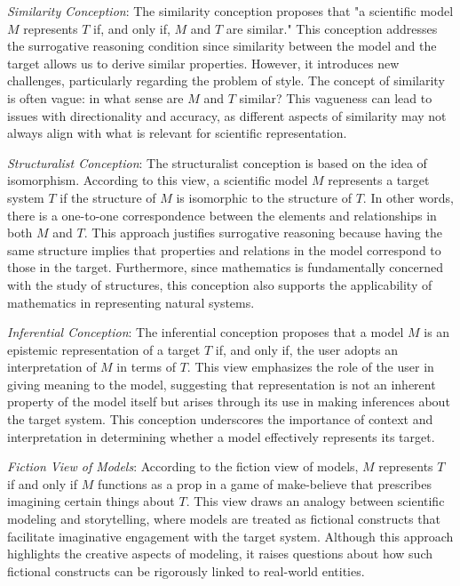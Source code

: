 \emph{Similarity Conception}: The similarity conception proposes that "a scientific model $M$ represents $T$ if, and only if, $M$ and $T$ are similar." This conception addresses the surrogative reasoning condition since similarity between the model and the target allows us to derive similar properties. However, it introduces new challenges, particularly regarding the problem of style. The concept of similarity is often vague: in what sense are $M$ and $T$ similar? This vagueness can lead to issues with directionality and accuracy, as different aspects of similarity may not always align with what is relevant for scientific representation.

\emph{Structuralist Conception}: The structuralist conception is based on the idea of isomorphism. According to this view, a scientific model $M$ represents a target system $T$ if the structure of $M$ is isomorphic to the structure of $T$. In other words, there is a one-to-one correspondence between the elements and relationships in both $M$ and $T$. This approach justifies surrogative reasoning because having the same structure implies that properties and relations in the model correspond to those in the target. Furthermore, since mathematics is fundamentally concerned with the study of structures, this conception also supports the applicability of mathematics in representing natural systems.

\emph{Inferential Conception}: The inferential conception proposes that a model $M$ is an epistemic representation of a target $T$ if, and only if, the user adopts an interpretation of $M$ in terms of $T$. This view emphasizes the role of the user in giving meaning to the model, suggesting that representation is not an inherent property of the model itself but arises through its use in making inferences about the target system. This conception underscores the importance of context and interpretation in determining whether a model effectively represents its target.

\emph{Fiction View of Models}: According to the fiction view of models, $M$ represents $T$ if and only if $M$ functions as a prop in a game of make-believe that prescribes imagining certain things about $T$. This view draws an analogy between scientific modeling and storytelling, where models are treated as fictional constructs that facilitate imaginative engagement with the target system. Although this approach highlights the creative aspects of modeling, it raises questions about how such fictional constructs can be rigorously linked to real-world entities.


